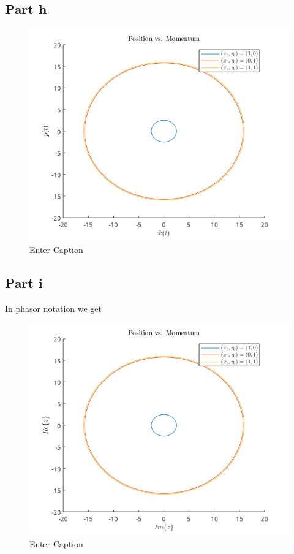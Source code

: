 \newpage
\subsection*{Part h}
\begin{figure}[h]
    \centering
    \includegraphics[width=1\linewidth]{Resources//245//Homework 4/245 Homework 4 Problem 2h.png}
    \caption{Enter Caption}
    \label{fig:enter-label}
\end{figure}

\subsection*{Part i}
In phasor notation we get

\begin{figure}[h]
    \centering
    \includegraphics[width=1\linewidth]{Resources//245//Homework 4/245 Homework 4 Problem 2i.png}
    \caption{Enter Caption}
    \label{fig:enter-label}
\end{figure}

